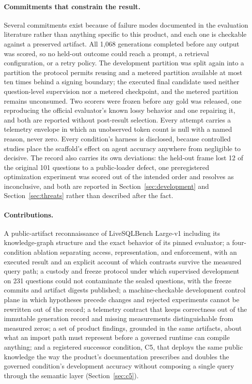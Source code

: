 \paragraph{Commitments that constrain the result.}
Several commitments exist because of failure modes documented in the evaluation
literature rather than anything specific to this product, and each one is
checkable against a preserved artifact. All 1,068 generations completed before
any output was scored, so no held-out outcome could reach a prompt, a retrieval
configuration, or a retry policy. The development partition was split again into
a partition the protocol permits reusing and a metered partition available at
most ten times behind a signing boundary; the executed final candidate used
neither question-level supervision nor a metered checkpoint, and the metered
partition remains unconsumed. Two scorers were frozen before any gold was
released, one reproducing the official evaluator's known lossy behavior and one
repairing it, and both are reported without post-result selection. Every attempt
carries a telemetry envelope in which an unobserved token count is null with a
named reason, never zero. Every condition's harness is disclosed, because
controlled studies place the scaffold's effect on agent accuracy anywhere from
negligible to decisive. The record also carries its own deviations: the held-out
frame lost 12 of the original 101 questions to a public-loader defect, one
preregistered optimization experiment was scored out of the intended order and
resolves as inconclusive, and both are reported in Section~\ref{sec:development}
and Section~\ref{sec:threats} rather than described after the fact.

\paragraph{Contributions.}
A public-artifact reconnaissance of LiveSQLBench Large-v1 including its
knowledge-graph structure and the exact behavior of its pinned evaluator; a
four-condition ablation separating access, representation, and enforcement, with
an executed result and an explicit account of which contrasts survive the
measured query path; a custody and freeze protocol under which supervised
development on 231 questions could not contaminate the sealed questions, with the
freeze commits and artifact digests published; a machine-checkable development
control plane in which hypotheses precede changes and rejected experiments cannot
be rewritten out of the record; a telemetry contract that keeps correctness out
of the immutable generation record and missing measurements distinguishable from
measured zeros; a set of product findings, grounded in the same artifacts,
about what an import path must represent before a governed runtime can compile
anything; and a registered successor condition, C5, that deploys the same public
knowledge the way the product's documentation prescribes and doubles the
governed condition's development accuracy without composing a single query
through the semantic layer (Section~\ref{sec:c5}).
